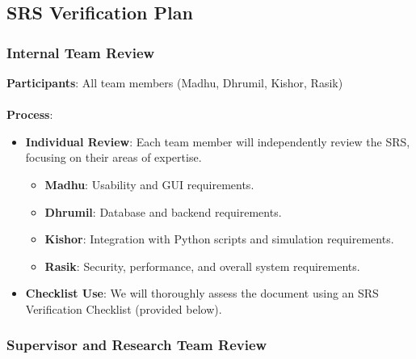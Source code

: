 \documentclass[12pt, titlepage]{article}
\begin{document}
\subsection{SRS Verification Plan}

\subsubsection{Internal Team Review}

\textbf{Participants}: All team members (Madhu, Dhrumil, Kishor, Rasik)
\\\\
\textbf{Process}:

\begin{itemize}
    \item \textbf{Individual Review}: Each team member will independently review the SRS, focusing on their areas of expertise.
    \begin{itemize}
        \item \textbf{Madhu}: Usability and GUI requirements.
        \item \textbf{Dhrumil}: Database and backend requirements.
        \item \textbf{Kishor}: Integration with Python scripts and simulation requirements.
        \item \textbf{Rasik}: Security, performance, and overall system requirements.
    \end{itemize}
    \item \textbf{Checklist Use}: We will thoroughly assess the document using an SRS Verification Checklist (provided below).
\end{itemize}

\subsubsection{Supervisor and Research Team Review}
\end{document}
